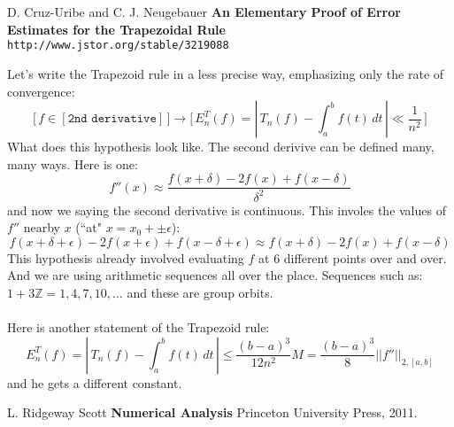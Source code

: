 \documentclass[12pt]{article}
\begin{document}
\vfill

\begin{thebibliography}{}

\item D. Cruz-Uribe and C. J. Neugebauer \textbf{An Elementary Proof of Error Estimates for the Trapezoidal Rule} \texttt{ http://www.jstor.org/stable/3219088}
 
\end{thebibliography} 

\newpage

\noindent 

Let's write the Trapezoid rule in a less precise way, emphasizing only the rate of convergence:
$$ \bigg[\, f \in [\texttt{2nd derivative}] \,\bigg] 
\to \Bigg[\,E_n^T(f) = \left|\, T_n(f) - \int_a^b f(t) \, dt \,\right| \ll \frac{1}{n^2}\, \Bigg] $$
What does this hypothesis look like.  The second derivive can be defined many, many ways.  Here is one:
$$ f''(x) \approx  \frac{f(x+\delta)-2f(x)+f(x-\delta)}{\delta^2}$$
and now we saying the second derivative is continuous.  This involes the values of $f''$ nearby $x$ (``at" $x = x_0 + \pm \epsilon$):
$$ f(x+\delta + \epsilon)-2f(x + \epsilon)+f(x-\delta + \epsilon) \approx f(x+\delta)-2f(x)+f(x-\delta)$$
This hypothesis already involved evaluating $f$ at 6 different points over and over.  And we are using arithmetic sequences all over the place.  Sequences such as: $ 1 + 3 \mathbb{Z} = 1,4,7,10,\dots $ and these are group orbits. \\ \\
Here is another statement of the Trapezoid rule:
$$  E_n^T(f) = \left|\, T_n(f) - \int_a^b f(t) \, dt \,\right| \leq \frac{(b-a)^3}{12n^2}M = \frac{(b-a)^3}{8} ||f''||_{2, [a,b]} $$
and he gets a different constant.

\vfill

\begin{thebibliography}{}

\item L. Ridgeway Scott \textbf{Numerical Analysis} Princeton University Press, 2011.
 
\end{thebibliography} 

\newpage
\end{document}
